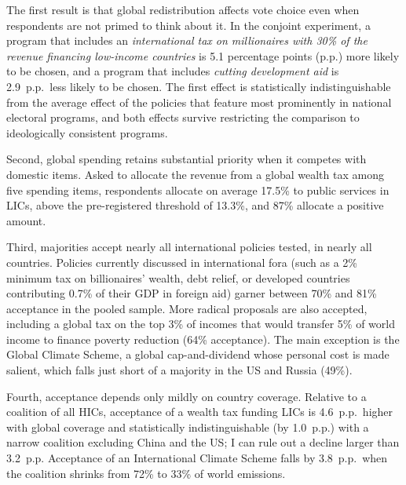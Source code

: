 \documentclass[12pt,english]{article}
\begin{document}
The first result is that global redistribution affects vote choice even when respondents are not primed to think about it. In the conjoint experiment, a program that includes an \textit{international tax on millionaires with 30\% of the revenue financing low-income countries} is 5.1 percentage points (p.p.) more likely to be chosen, and a program that includes \textit{cutting development aid} is 2.9~p.p.\ less likely to be chosen. The first effect is statistically indistinguishable from the average effect of the policies that feature most prominently in national electoral programs, and both effects survive restricting the comparison to ideologically consistent programs.

Second, global spending retains substantial priority when it competes with domestic items. Asked to allocate the revenue from a global wealth tax among five spending items, respondents allocate on average 17.5\% to public services in LICs, above the pre-registered threshold of 13.3\%, and 87\% allocate a positive amount.

Third, majorities accept nearly all international policies tested, in nearly all countries. Policies currently discussed in international fora (such as a 2\% minimum tax on billionaires' wealth, debt relief, or developed countries contributing 0.7\% of their GDP in foreign aid) garner between 70\% and 81\% acceptance in the pooled sample. More radical proposals are also accepted, including a global tax on the top 3\% of incomes that would transfer 5\% of world income to finance poverty reduction (64\% acceptance). The main exception is the Global Climate Scheme, a global cap-and-dividend whose personal cost is made salient, which falls just short of a majority in the US and Russia (49\%).

Fourth, acceptance depends only mildly on country coverage. Relative to a coalition of all HICs, acceptance of a wealth tax funding LICs is 4.6~p.p.\ higher with global coverage and statistically indistinguishable (by 1.0~p.p.) with a narrow coalition excluding China and the US; I can rule out a decline larger than 3.2~p.p. Acceptance of an International Climate Scheme falls by 3.8~p.p.\ when the coalition shrinks from 72\% to 33\% of world emissions.
\end{document}
